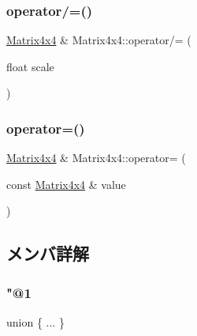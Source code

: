 \mbox{\label{struct_math_1_1_matrix4x4_af4b1bfd9239ce87f82090f05645c08c3}} 
\subsubsection{\texorpdfstring{operator/=()}{operator/=()}}
{\footnotesize\ttfamily \mbox{\hyperlink{struct_math_1_1_matrix4x4}{Matrix4x4}} \& Matrix4x4\+::operator/= (\begin{DoxyParamCaption}\item[{float}]{scale }\end{DoxyParamCaption})}

\mbox{\label{struct_math_1_1_matrix4x4_a9ee081e0ca62967af780d4979a58deb2}} 
\subsubsection{\texorpdfstring{operator=()}{operator=()}}
{\footnotesize\ttfamily \mbox{\hyperlink{struct_math_1_1_matrix4x4}{Matrix4x4}} \& Matrix4x4\+::operator= (\begin{DoxyParamCaption}\item[{const \mbox{\hyperlink{struct_math_1_1_matrix4x4}{Matrix4x4}} \&}]{value }\end{DoxyParamCaption})}



\subsection{メンバ詳解}
\mbox{\label{struct_math_1_1_matrix4x4_a26661b2ee7b330182342e8479d648721}} 
\subsubsection{\texorpdfstring{"@1}{@1}}
{\footnotesize\ttfamily union \{ ... \} }

\mbox{\label{struct_math_1_1_matrix4x4_a6286cd46feb2d7f065a6c536dee4405b}} 
